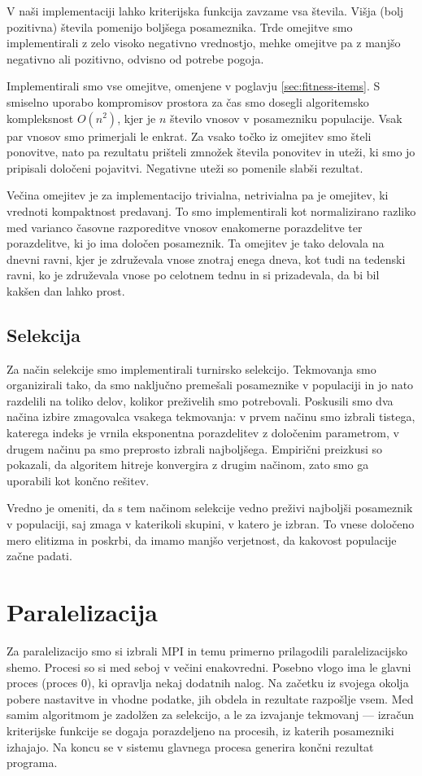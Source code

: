 \documentclass[a4paper,12pt]{book}
\begin{document}
V naši implementaciji lahko kriterijska funkcija zavzame vsa števila. Višja (bolj pozitivna) števila pomenijo boljšega posameznika. Trde omejitve smo implementirali z zelo visoko negativno vrednostjo, mehke omejitve pa z manjšo negativno ali pozitivno, odvisno od potrebe pogoja. 

Implementirali smo vse omejitve, omenjene v poglavju \ref{sec:fitness-items}. S smiselno uporabo kompromisov prostora za čas smo dosegli algoritemsko kompleksnost $O(n^2)$, kjer je $n$ število vnosov v posamezniku populacije. Vsak par vnosov smo primerjali le enkrat. Za vsako točko iz omejitev smo šteli ponovitve, nato pa rezultatu prišteli zmnožek števila ponovitev in uteži, ki smo jo pripisali določeni pojavitvi. Negativne uteži so pomenile slabši rezultat. 

Večina omejitev je za implementacijo trivialna, netrivialna pa je omejitev, ki vrednoti kompaktnost predavanj. To smo implementirali kot normalizirano razliko med varianco časovne razporeditve vnosov enakomerne porazdelitve ter porazdelitve, ki jo ima določen posameznik. Ta omejitev je tako delovala na dnevni ravni, kjer je združevala vnose znotraj enega dneva, kot tudi na tedenski ravni, ko je združevala vnose po celotnem tednu in si prizadevala, da bi bil kakšen dan lahko prost. 


\subsection{Selekcija}
Za način selekcije smo implementirali turnirsko selekcijo. Tekmovanja smo organizirali tako, da smo naključno premešali posameznike v populaciji in jo nato razdelili na toliko delov, kolikor preživelih smo potrebovali. Poskusili smo dva načina izbire zmagovalca vsakega tekmovanja: v prvem načinu smo izbrali tistega, katerega indeks je vrnila eksponentna porazdelitev z določenim parametrom, v drugem načinu pa smo preprosto izbrali najboljšega. Empirični preizkusi so pokazali, da algoritem hitreje konvergira z drugim načinom, zato smo ga uporabili kot končno rešitev. 

Vredno je omeniti, da s tem načinom selekcije vedno preživi najboljši posameznik v populaciji, saj zmaga v katerikoli skupini, v katero je izbran. To vnese določeno mero elitizma in poskrbi, da imamo manjšo verjetnost, da kakovost populacije začne padati. 

\section{Paralelizacija}
Za paralelizacijo smo si izbrali MPI in temu primerno prilagodili paralelizacijsko shemo. Procesi so si med seboj v večini enakovredni. Posebno vlogo ima le glavni proces (proces $0$), ki opravlja nekaj dodatnih nalog. Na začetku iz svojega okolja pobere nastavitve in vhodne podatke, jih obdela in rezultate razpošlje vsem. Med samim algoritmom je zadolžen za selekcijo, a le za izvajanje tekmovanj --- izračun kriterijske funkcije se dogaja porazdeljeno na procesih, iz katerih posamezniki izhajajo. Na koncu se v sistemu glavnega procesa generira končni rezultat programa. 
\end{document}
